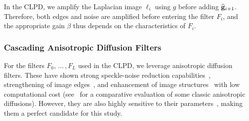 In the CLPD, we amplify the Laplacian image \({\boldsymbol\ell}_i\) using \(g\) before adding \(\widehat{\mathbf{g}}_{i+1}\).
Therefore, both edges and noise are amplified before entering the filter \(F_i\), and the appropriate gain \(\beta\) thus depends on the characteristics of \(F_i\).

\subsubsection{Cascading Anisotropic Diffusion Filters}
For the filters \(F_0,\,\ldots\,, F_L\) used in the CLPD, we leverage anisotropic diffusion filters.
These have shown strong speckle-noise reduction capabilities~\cite{duarte-salazar_speckle_2020}, strengthening of image edges~\cite{zhang_multiscale_2006}, and enhancement of image structures~\cite{abd-elmoniem_realtime_2002, kang_new_2016} with low computational cost (see~\cite{finn_echocardiographic_2011} for a comparative evaluation of some classic anisotropic diffusions).
However, they are also highly sensitive to their parameters~\cite{duarte-salazar_speckle_2020}, making them a perfect candidate for this study.

